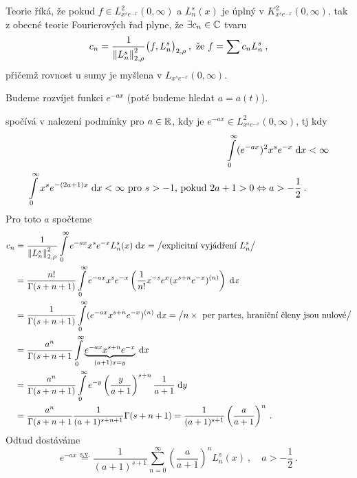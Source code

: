 Teorie říká, že pokud $f\in L^2_{x^se^{-x}}(0,\infty)$ a $L_n^s(x)$ je úplný v $K^2_{x^se^{-x}}(0,\infty)$, tak z obecné teorie Fourierových řad plyne, že $\exists c_n\in\mathbb{C}$ tvaru
$$c_n=\frac{1}{\left\lVert L_n^s\right\rVert_{2,\rho}^2} \big( f, L_n^s \big)_{2,\rho}\:,\text{ že } f=\sum c_nL_n^s\:,$$ 
přičemž rovnost u sumy je myšlena v $L_{x^se^{-x}}(0,\infty)$.

Budeme rozvíjet funkci $e^{-ax}$ (poté budeme hledat $a=a(t)$).

 spočívá v nalezení podmínky pro $a\in\mathbb{R}$, kdy je $e^{-ax}\in L^2_{x^se^{-x}}(0,\infty)$, tj kdy 
\begin{align*}
    \int\limits_0^\infty(e^{-ax})^2x^se^{-x}\;\mathrm{d}x &<\infty \\
    \int\limits_0^\infty x^se^{-(2a+1)x}\;\mathrm{d}x<\infty \text{ pro } s>-1 \text{, pokud }2a+1>0 \Leftrightarrow a>-\frac{1}{2}\:.
\end{align*}
Pro toto $a$ spočteme
\begin{align*}
    c_n&=\frac{1}{\left\lVert L_n^s\right\rVert_{2,\rho}^2}\int\limits_0^\infty e^{-ax}x^se^{-x}L_n^s(x)\;\mathrm{d}x = \big/\text{explicitní vyjádření }L_n^s\big/ \\
    &=\frac{n!}{\Gamma(s+n+1)}\int\limits_0^\infty e^{-ax}x^se^{-x}\left(\frac{1}{n!}x^{-s}e^x(x^{s+n}e^{-x})^{(n)}\right)\;\mathrm{d}x\\
    &=\frac{1}{\Gamma(s+n+1)}\int\limits_0^\infty (e^{-ax}x^{s+n}e^{-x})^{(n)}\;\mathrm{d}x = \big/n\times\text{ per partes, hraniční členy jsou nulové}\big/\\
    &=\frac{a^n}{\Gamma(s+n+1}\int\limits_0^\infty \underbrace{e^{-ax}x^{s+n}e^{-x}}_{(a+1)x = y}\;\mathrm{d}x \\
    &=\frac{a^n}{\Gamma(s+n+1)}\int\limits_0^\infty e^{-y}\left(\frac{y}{a+1}\right)^{s+n}\frac{1}{a+1}\;\mathrm{d}y \\
    &=\frac{a^n}{\Gamma(s+n+1}\frac{1}{(a+1)^{s+n+1}}\Gamma(s+n+1)=\frac{1}{(a+1)^{s+1}}\left(\frac{a}{a+1}\right)^n\:.
\end{align*}
Odtud dostáváme
\begin{equation}
    \boxed{e^{-ax}\overset{\text{s.v.}}{=}\frac{1}{(a+1)^{s+1}}\sum\limits_{n=0}^\infty \left(\frac{a}{a+1}\right)^n L_n^s(x)\:,\quad a>-\frac{1}{2}\:.
}
\label{eq:rada_e^-ax}
\end{equation}

